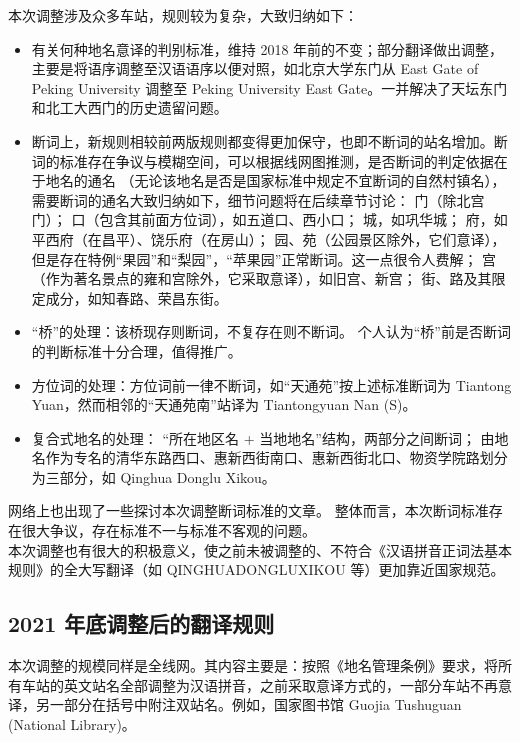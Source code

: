 \documentclass[a4paper,UTF8,12pt]{ctexart}
\begin{document}
        本次调整涉及众多车站，规则较为复杂，大致归纳如下：
        \begin{itemize}
            \item 有关何种地名意译的判别标准，维持 2018 年前的不变；部分翻译做出调整，主要是将语序调整至汉语语序以便对照，如北京大学东门从 East Gate of Peking University 调整至 Peking University East Gate。一并解决了天坛东门和北工大西门的历史遗留问题。
            \item 断词上，新规则相较前两版规则都变得更加保守，也即不断词的站名增加。断词的标准存在争议与模糊空间，可以根据线网图推测，是否断词的判定依据在于地名的通名
            （无论该地名是否是国家标准中规定不宜断词的自然村镇名），需要断词的通名大致归纳如下，细节问题将在后续章节讨论：
                \subitem 门（除北宫门）；
                \subitem 口（包含其前面方位词），如五道口、西小口；
                \subitem 城，如巩华城；
                \subitem 府，如平西府（在昌平）、饶乐府（在房山）；
                \subitem 园、苑（公园景区除外，它们意译），但是存在特例“果园”和“梨园”，“苹果园”正常断词。这一点很令人费解；
                \subitem 宫（作为著名景点的雍和宫除外，它采取意译），如旧宫、新宫；
                \subitem 街、路及其限定成分，如知春路、荣昌东街。
            \item “桥”的处理：该桥现存则断词，不复存在则不断词。\cite{ref14} 个人认为“桥”前是否断词的判断标准十分合理，值得推广。
            \item 方位词的处理：方位词前一律不断词，如“天通苑”按上述标准断词为 Tiantong Yuan，然而相邻的“天通苑南”站译为 Tiantongyuan Nan (S)。
            \item 复合式地名的处理：
                \subitem “所在地区名 + 当地地名”结构，两部分之间断词；
                \subitem 由地名作为专名的清华东路西口、惠新西街南口、惠新西街北口、物资学院路划分为三部分，如 Qinghua Donglu Xikou。
        \end{itemize}

        网络上也出现了一些探讨本次调整断词标准的文章。\cite{ref14} 整体而言，本次断词标准存在很大争议，存在标准不一与标准不客观的问题。\\
        本次调整也有很大的积极意义，使之前未被调整的、不符合《汉语拼音正词法基本规则》的全大写翻译（如 QINGHUADONGLUXIKOU 等）更加靠近国家规范。

    \subsection{2021 年底调整后的翻译规则}
        本次调整的规模同样是全线网。其内容主要是：按照《地名管理条例》要求，将所有车站的英文站名全部调整为汉语拼音，之前采取意译方式的，一部分车站不再意译，另一部分在括号中附注双站名。例如，国家图书馆 Guojia Tushuguan (National Library)。
        
\end{document}

